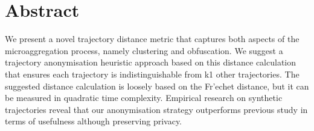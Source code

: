 \section*{Abstract}
We present a novel trajectory distance metric that captures both aspects of the microaggregation process, namely clustering and obfuscation. We suggest a trajectory anonymisation heuristic approach based on this distance calculation that ensures each trajectory is indistinguishable from k1 other trajectories. The suggested distance calculation is loosely based on the Fr'echet distance, but it can be measured in quadratic time complexity. Empirical research on synthetic trajectories reveal that our anonymisation strategy outperforms previous study in terms of usefulness although preserving privacy.